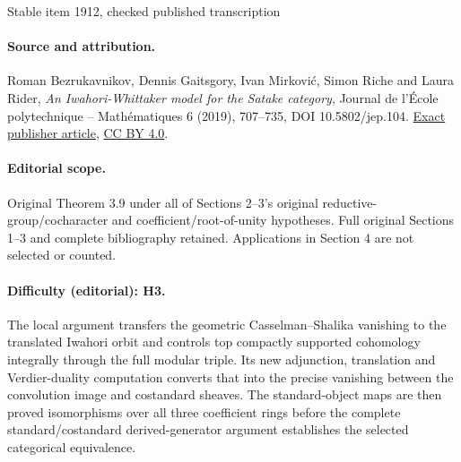 \documentclass[10pt]{article}
\theoremstyle{remark}
\numberwithin{equation}{section}
\begin{document}
\begin{center}{\Large Stable item 1912, checked published transcription}\end{center}
\paragraph{Source and attribution.} Roman Bezrukavnikov, Dennis Gaitsgory, Ivan Mirković, Simon Riche and Laura Rider, \emph{An Iwahori-Whittaker model for the Satake category}, Journal de l’École polytechnique -- Mathématiques 6 (2019), 707--735, DOI 10.5802/jep.104. \href{https://jep.centre-mersenne.org/articles/10.5802/jep.104/}{Exact publisher article}, \href{https://creativecommons.org/licenses/by/4.0/}{CC BY 4.0}.
\paragraph{Editorial scope.} Original Theorem 3.9 under all of Sections 2--3's original reductive-group/cocharacter and coefficient/root-of-unity hypotheses. Full original Sections 1--3 and complete bibliography retained. Applications in Section 4 are not selected or counted.
\paragraph{Difficulty (editorial): H3.} The local argument transfers the geometric Casselman--Shalika vanishing to the translated Iwahori orbit and controls top compactly supported cohomology integrally through the full modular triple. Its new adjunction, translation and Verdier-duality computation converts that into the precise vanishing between the convolution image and costandard sheaves. The standard-object maps are then proved isomorphisms over all three coefficient rings before the complete standard/costandard derived-generator argument establishes the selected categorical equivalence.
\end{document}
